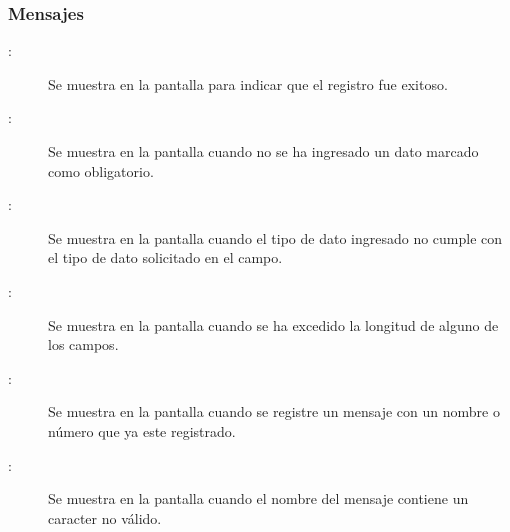 \subsubsection{Mensajes}

	
\begin{description}
	\item[:] Se muestra en la pantalla  para indicar que el registro fue exitoso.
	\item[:] Se muestra en la pantalla  cuando no se ha ingresado un dato marcado como obligatorio.
	\item[:] Se muestra en la pantalla  cuando el tipo de dato ingresado no cumple con el tipo de dato solicitado en el campo.
	\item[:] Se muestra en la pantalla  cuando se ha excedido la longitud de alguno de los campos.
	\item[:] Se muestra en la pantalla  cuando se registre un mensaje con un nombre o número que ya este registrado.
	\item[:] Se muestra en la pantalla  cuando el nombre del mensaje contiene un caracter no válido.
\end{description}
